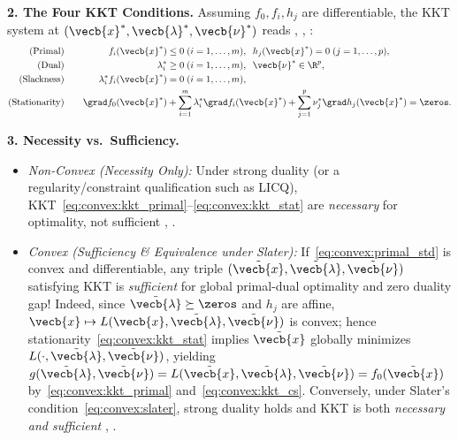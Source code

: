 \documentclass[../../../../master.tex]{subfiles}
\begin{document}
\begin{coremath}
\textbf{2. The Four KKT Conditions.} Assuming $f_0, f_i, h_j$ are differentiable, the KKT system at $(\vecb{x}^*, \vecb{\lambda}^*, \vecb{\nu}^*)$ reads , , :
\begin{alignat}{2}
  \text{(Primal)}\quad && f_i(\vecb{x}^*) &\le 0 \;(i=1,\dots,m),\;\; h_j(\vecb{x}^*) = 0 \;(j=1,\dots,p), \label{eq:convex:kkt_primal} \\
  \text{(Dual)}\quad && \lambda_i^* &\ge 0 \;(i=1,\dots,m),\;\; \vecb{\nu}^* \in \R^p, \label{eq:convex:kkt_dual} \\
  \text{(Slackness)}\quad && \lambda_i^* f_i(\vecb{x}^*) &= 0 \;(i=1,\dots,m), \label{eq:convex:kkt_cs} \\
  \text{(Stationarity)}\quad && \grad f_0(\vecb{x}^*) &+ \sum_{i=1}^m \lambda_i^* \grad f_i(\vecb{x}^*) + \sum_{j=1}^p \nu_j^* \grad h_j(\vecb{x}^*) = \zeros. \label{eq:convex:kkt_stat}
\end{alignat}

\textbf{3. Necessity vs.\ Sufficiency.}
\begin{itemize}[leftmargin=1.4em]
  \item \emph{Non-Convex (Necessity Only):} Under strong duality (or a regularity/constraint qualification such as LICQ), KKT~\eqref{eq:convex:kkt_primal}--\eqref{eq:convex:kkt_stat} are \emph{necessary} for optimality, not sufficient , .
  \item \emph{Convex (Sufficiency \& Equivalence under Slater):} If~\eqref{eq:convex:primal_std} is convex and differentiable, any triple $(\tilde{\vecb{x}}, \tilde{\vecb{\lambda}}, \tilde{\vecb{\nu}})$ satisfying KKT is \emph{sufficient} for global primal-dual optimality and zero duality gap! Indeed, since $\tilde{\vecb{\lambda}} \succeq \zeros$ and $h_j$ are affine, $\vecb{x} \mapsto L(\vecb{x}, \tilde{\vecb{\lambda}}, \tilde{\vecb{\nu}})$ is convex; hence stationarity~\eqref{eq:convex:kkt_stat} implies $\tilde{\vecb{x}}$ globally minimizes $L(\cdot, \tilde{\vecb{\lambda}}, \tilde{\vecb{\nu}})$, yielding $g(\tilde{\vecb{\lambda}}, \tilde{\vecb{\nu}}) = L(\tilde{\vecb{x}}, \tilde{\vecb{\lambda}}, \tilde{\vecb{\nu}}) = f_0(\tilde{\vecb{x}})$ by~\eqref{eq:convex:kkt_primal} and~\eqref{eq:convex:kkt_cs}. Conversely, under Slater's condition~\eqref{eq:convex:slater}, strong duality holds and KKT is both \emph{necessary and sufficient} , .
\end{itemize}
\end{coremath}
\end{document}
